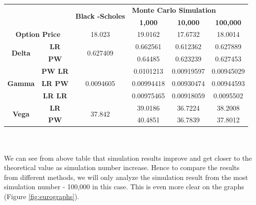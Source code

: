 \documentclass[12pt,a4paper,fleqn]{article}
\begin{document}
\label{my-label}
\begin{tabular}{|c|c|c|c|c|c|}
\hline
\multicolumn{2}{|c|}{\multirow{2}{*}{}}          & \multirow{2}{*}{\textbf{Black -Scholes}} & \multicolumn{3}{l|}{\textbf{Monte Carlo Simulation}} \\ \cline{4-6}
\multicolumn{2}{|c|}{}                           &                                          & \textbf{1,000}  & \textbf{10,000} & \textbf{100,000} \\ \hline
\multicolumn{2}{|c|}{\textbf{Option Price}}      & 18.023                                   & 19.0162         & 17.6732         & 18.0014          \\ \hline
\multirow{2}{*}{\textbf{Delta}} & \textbf{LR}    & \multirow{2}{*}{0.627409}                & 0.662561        & 0.612362        & 0.627889         \\ \cline{2-2} \cline{4-6}
                                & \textbf{PW}    &                                          & 0.64485         & 0.623239        & 0.627453         \\ \hline
\multirow{3}{*}{\textbf{Gamma}} & \textbf{PW LR} & \multirow{3}{*}{0.0094605}               & 0.0101213       & 0.00919597      & 0.00945029       \\ \cline{2-2} \cline{4-6}
                                & \textbf{LR PW} &                                          & 0.00994418      & 0.00930474      & 0.00944593       \\ \cline{2-2} \cline{4-6}
                                & \textbf{LR LR} &                                          & 0.00975465      & 0.00918059      & 0.0095502        \\ \hline
\multirow{2}{*}{\textbf{Vega}}  & \textbf{LR}    & \multirow{2}{*}{37.842}                  & 39.0186         & 36.7224         & 38.2008          \\ \cline{2-2} \cline{4-6}
                                & \textbf{PW}    &                                          & 40.4851         & 36.7839         & 37.8012          \\ \hline
\end{tabular}\\ \\


We can see from above table that simulation results improve and get closer to the theoretical value as simulation number increase. Hence to compare the results from different methods, we will only analyze the simulation result from the most simulation number - 100,000 in this case. This is even more clear on the graphs (Figure \ref{fig:eurographs}).
\end{document}
